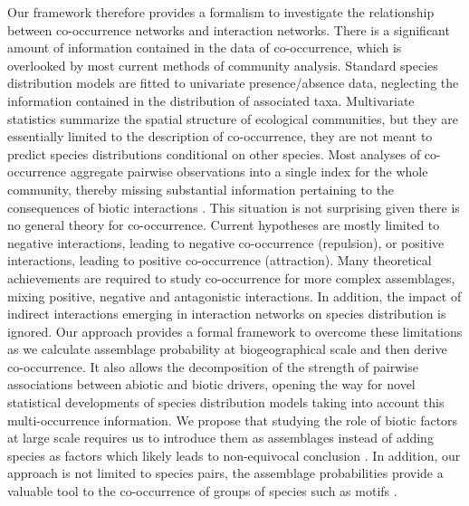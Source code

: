 Our framework therefore provides a formalism to investigate the relationship between co-occurrence networks \citep{Araujo2011} and interaction networks. There is a significant amount of information contained in the data of co-occurrence, which is overlooked by most current methods of community analysis. Standard species distribution models are fitted to univariate presence/absence data, neglecting the information contained in the distribution of associated taxa. Multivariate statistics summarize the spatial structure of ecological communities, but they are essentially limited to the description of co-occurrence, they are not meant to predict species distributions conditional on other species. Most analyses of co-occurrence aggregate pairwise observations into a single index for the whole community, thereby missing substantial information pertaining to the consequences of biotic interactions \citep{Boulangeat2012}. This situation is not surprising given there is no general theory for co-occurrence. Current hypotheses are mostly limited to negative interactions, leading to negative co-occurrence (repulsion), or positive interactions, leading to positive co-occurrence (attraction). Many theoretical achievements are required to study co-occurrence for more complex assemblages, mixing positive, negative and antagonistic interactions. In addition, the impact of indirect interactions emerging in interaction networks on species distribution is ignored. Our approach provides a formal framework to overcome these limitations as we calculate assemblage probability at biogeographical scale and then derive co-occurrence. It also allows the decomposition of the strength of pairwise associations between abiotic and biotic drivers, opening the way for novel statistical developments of species distribution models taking into account this multi-occurrence information. We propose that studying the role of biotic factors at large scale requires us to introduce them as assemblages instead of adding species as factors which likely leads to non-equivocal conclusion \citep{Araujo2007}. In addition, our approach is not limited to species pairs, the assemblage probabilities provide a valuable tool to the co-occurrence of groups of species such as motifs \citep{Stouffer2007}.

